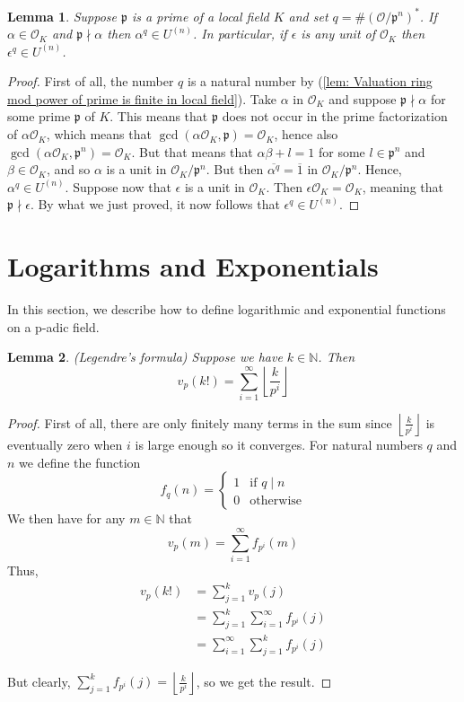\documentclass{article}
\newtheorem{lemma}{Lemma}[section]
\newcommand{\mfrak}[1]{\mathfrak{#1}}
\newcommand{\mcal}[1]{\mathcal{#1}}
\newcommand{\mbb}[1]{\mathbb{#1}}
\begin{document}
\begin{lemma}
    Suppose $\mfrak p$ is a prime of a local field $K$ and set $q = \# (\mcal O / \mfrak p^n)^*$. If $\alpha \in \mcal O_K$ and $\mfrak p \nmid \alpha$ then $\alpha^q \in U^{(n)}$. In particular, if $\epsilon$ is any unit of $\mcal O_K$ then $\epsilon^q \in U^{(n)}$.
\end{lemma}
\begin{proof}
    First of all, the number $q$ is a natural number by (\ref{lem: Valuation ring mod power of prime is finite in local field}). Take $\alpha$ in $\mcal O_K$ and suppose $\mfrak p \nmid \alpha$ for some prime $\mfrak p$ of $K$. This means that $\mfrak p$ does not occur in the prime factorization of $\alpha \mcal O_K$, which means that $\gcd(\alpha \mcal O_K, \mfrak p) = \mcal O_K$, hence also $\gcd(\alpha \mcal O_K, \mfrak p^n) = \mcal O_K$. But that means that $\alpha \beta + l = 1$ for some $l \in \mfrak p^n$ and $\beta \in \mcal O_K$, and so $\alpha$ is a unit in $\mcal O_K / \mfrak p^n$. But then $\overline{\alpha^q} = \overline 1$ in $\mcal O_K / \mfrak p^n$. Hence, $\alpha^q \in U^{(n)}$. Suppose now that $\epsilon$ is a unit in $\mcal O_K$. Then $\epsilon \mcal O_K = \mcal O_K$, meaning that $\mfrak p \nmid \epsilon$. By what we just proved, it now follows that $\epsilon^q \in U^{(n)}$. 
\end{proof}



\section{Logarithms and Exponentials}
In this section, we describe how to define logarithmic and exponential functions on a p-adic field. 


\begin{lemma}(Legendre's formula)
    Suppose we have $k \in \mbb N$. Then
    $$v_p(k!) = \sum_{i = 1}^{\infty} \left\lfloor \frac{k}{p^i} \right \rfloor$$
\end{lemma}

\begin{proof}
    First of all, there are only finitely many terms in the sum since $\left\lfloor \frac{k}{p^i} \right \rfloor$ is eventually zero when $i$ is large enough so it converges. For natural numbers $q$ and $n$ we define the function 
    $$f_q(n) = \begin{cases}
        1 & \text{if } q \mid n \\
        0 & \text{otherwise}
    \end{cases}$$
    We then have for any $m \in \mbb N$ that
    $$v_p(m) = \sum_{i = 1}^{\infty} f_{p^i}(m)$$
    Thus,
    \begin{align*}
        v_p(k!) &= \sum_{j = 1}^k v_p(j) \\
        &= \sum_{j = 1}^k \sum_{i = 1}^{\infty} f_{p^i}(j) \\
        &= \sum_{i = 1}^{\infty} \sum_{j = 1}^k f_{p^i}(j)
    \end{align*}


    But clearly, $\sum_{j = 1}^k f_{p^i}(j) = \left\lfloor \frac{k}{p^i} \right \rfloor$, so we get the result. 
\end{proof}
\end{document}
